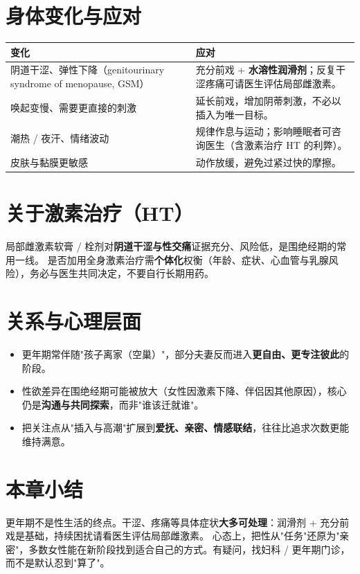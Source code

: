 \section{身体变化与应对}
\begin{tabularx}{\textwidth}{l X}
\toprule
\textbf{变化} & \textbf{应对} \\
\midrule
阴道干涩、弹性下降（genitourinary syndrome of menopause, GSM） & 充分前戏 + \textbf{水溶性润滑剂}；反复干涩疼痛可请医生评估局部雌激素。 \\
唤起变慢、需要更直接的刺激 & 延长前戏，增加阴蒂刺激，不必以插入为唯一目标。 \\
潮热 / 夜汗、情绪波动 & 规律作息与运动；影响睡眠者可咨询医生（含激素治疗 HT 的利弊）。 \\
皮肤与黏膜更敏感 & 动作放缓，避免过紧过快的摩擦。 \\
\bottomrule
\end{tabularx}

\section{关于激素治疗（HT）}
局部雌激素软膏 / 栓剂对\textbf{阴道干涩与性交痛}证据充分、风险低，是围绝经期的常用一线。
是否加用全身激素治疗需\textbf{个体化}权衡（年龄、症状、心血管与乳腺风险），务必与医生共同决定，不要自行长期用药。

\section{关系与心理层面}
\begin{itemize}
  \item 更年期常伴随"孩子离家（空巢）"，部分夫妻反而进入\textbf{更自由、更专注彼此}的阶段。
  \item 性欲差异在围绝经期可能被放大（女性因激素下降、伴侣因其他原因），核心仍是\textbf{沟通与共同探索}，而非"谁该迁就谁"。
  \item 把关注点从"插入与高潮"扩展到\textbf{爱抚、亲密、情感联结}，往往比追求次数更能维持满意。
\end{itemize}

\section{本章小结}
更年期不是性生活的终点。干涩、疼痛等具体症状\textbf{大多可处理}：润滑剂 + 充分前戏是基础，持续困扰请看医生评估局部雌激素。
心态上，把性从"任务"还原为"亲密"，多数女性能在新阶段找到适合自己的方式。有疑问，找妇科 / 更年期门诊，而不是默认忍到"算了"。


